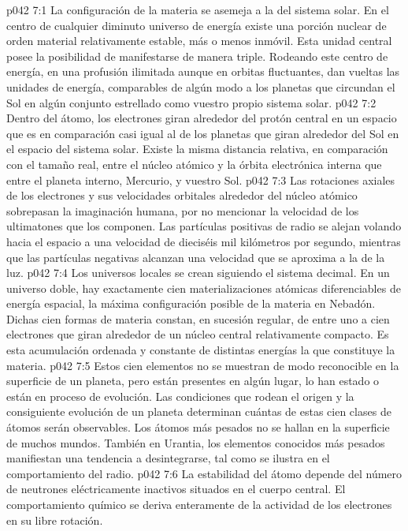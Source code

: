 \vs p042 7:1 La configuración de la materia se asemeja a la del sistema solar. En el centro de cualquier diminuto universo de energía existe una porción nuclear de orden material relativamente estable, más o menos inmóvil. Esta unidad central posee la posibilidad de manifestarse de manera triple. Rodeando este centro de energía, en una profusión ilimitada aunque en orbitas fluctuantes, dan vueltas las unidades de energía, comparables de algún modo a los planetas que circundan el Sol en algún conjunto estrellado como vuestro propio sistema solar.
\vs p042 7:2 \pc Dentro del átomo, los electrones giran alrededor del protón central en un espacio que es en comparación casi igual al de los planetas que giran alrededor del Sol en el espacio del sistema solar. Existe la misma distancia relativa, en comparación con el tamaño real, entre el núcleo atómico y la órbita electrónica interna que entre el planeta interno, Mercurio, y vuestro Sol.
\vs p042 7:3 Las rotaciones axiales de los electrones y sus velocidades orbitales alrededor del núcleo atómico sobrepasan la imaginación humana, por no mencionar la velocidad de los ultimatones que los componen. Las partículas positivas de radio se alejan volando hacia el espacio a una velocidad de dieciséis mil kilómetros por segundo, mientras que las partículas negativas alcanzan una velocidad que se aproxima a la de la luz.
\vs p042 7:4 \pc Los universos locales se crean siguiendo el sistema decimal. En un universo doble, hay exactamente cien materializaciones atómicas diferenciables de energía espacial, la máxima configuración posible de la materia en Nebadón. Dichas cien formas de materia constan, en sucesión regular, de entre uno a cien electrones que giran alrededor de un núcleo central relativamente compacto. Es esta acumulación ordenada y constante de distintas energías la que constituye la materia.
\vs p042 7:5 Estos cien elementos no se muestran de modo reconocible en la superficie de un planeta, pero están presentes en algún lugar, lo han estado o están en proceso de evolución. Las condiciones que rodean el origen y la consiguiente evolución de un planeta determinan cuántas de estas cien clases de átomos serán observables. Los átomos más pesados no se hallan en la superficie de muchos mundos. También en Urantia, los elementos conocidos más pesados manifiestan una tendencia a desintegrarse, tal como se ilustra en el comportamiento del radio.
\vs p042 7:6 La estabilidad del átomo depende del número de neutrones eléctricamente inactivos situados en el cuerpo central. El comportamiento químico se deriva enteramente de la actividad de los electrones en su libre rotación.
